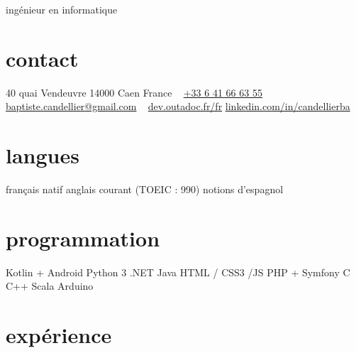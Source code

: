 \documentclass[]{friggeri-cv}
\begin{document}
{ingénieur en informatique}

\begin{aside}
    \section{contact}
    40 quai Vendeuvre
    14000 Caen
    France
    ~
    \href{tel:0033641666355}{+33 6 41 66 63 55}
    \href{mailto:baptiste.candellier@gmail.com}{baptiste.candellier@gmail.com}
    ~
    {\NoAutoSpacing\href{https://dev.outadoc.fr/fr}{dev.outadoc.fr/fr}}
    {\NoAutoSpacing\href{https://www.linkedin.com/in/candellierba/}{linkedin.com/in/candellierba}}
    \section{langues}
    français natif
    anglais courant (TOEIC : 990)
    notions d'espagnol
    \section{programmation}
    Kotlin + Android 
    Python 3 
    \csharp{} .NET 
    Java 
    HTML / CSS3 /JS 
    PHP + Symfony 
    C 
    C++ 
    Scala 
    Arduino 
    \restorecr 
    \obeycr
\end{aside}

\section{expérience}
\end{document}

